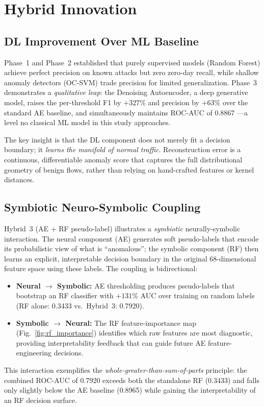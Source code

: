 \documentclass[10pt,conference]{IEEEtran}
\begin{document}
\section{Hybrid Innovation}
\label{sec:innovation}

\subsection{DL Improvement Over ML Baseline}

Phase~1 and Phase~2 established that purely supervised models (Random
Forest) achieve perfect precision on known attacks but zero zero-day
recall, while shallow anomaly detectors (OC-SVM) trade precision for
limited generalization.  Phase~3 demonstrates a \emph{qualitative leap}:
the Denoising Autoencoder, a deep generative model, raises the
per-threshold F1 by \(+327\%\) and precision by \(+63\%\) over the
standard AE baseline, and simultaneously maintains ROC-AUC of 0.8867
---a level no classical ML model in this study approaches.

The key insight is that the DL component does not merely fit a
decision boundary; it \emph{learns the manifold of normal traffic}.
Reconstruction error is a continuous, differentiable anomaly score that
captures the full distributional geometry of benign flows, rather than
relying on hand-crafted features or kernel distances.

\subsection{Symbiotic Neuro-Symbolic Coupling}

Hybrid~3 (AE + RF pseudo-label) illustrates a \emph{symbiotic}
neurally-symbolic interaction.  The neural component (AE) generates
soft pseudo-labels that encode its probabilistic view of what is
``anomalous''; the symbolic component (RF) then learns an explicit,
interpretable decision boundary in the original 68-dimensional feature
space using these labels.  The coupling is bidirectional:
\begin{itemize}[leftmargin=*,noitemsep]
  \item \textbf{Neural $\to$ Symbolic:} AE thresholding produces
        pseudo-labels that bootstrap an RF classifier with
        \(+131\%\) AUC over training on random labels (RF alone:
        0.3433 vs.\ Hybrid~3: 0.7920).
  \item \textbf{Symbolic $\to$ Neural:} The RF feature-importance map
        (Fig.~\ref{fig:rf_importance}) identifies which raw features are
        most diagnostic, providing interpretability feedback that can
        guide future AE feature-engineering decisions.
\end{itemize}
This interaction exemplifies the \emph{whole-greater-than-sum-of-parts}
principle: the combined ROC-AUC of 0.7920 exceeds both the standalone
RF (0.3433) and falls only slightly below the AE baseline (0.8965)
while gaining the interpretability of an RF decision surface.
\end{document}
